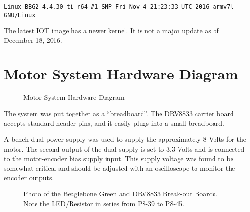\begin{verbatim}
Linux BBG2 4.4.30-ti-r64 #1 SMP Fri Nov 4 21:23:33 UTC 2016 armv7l GNU/Linux
\end{verbatim}

The latest IOT image has a newer kernel.  It is not a major update as of December 18, 2016.

\section{Motor System Hardware Diagram}

\begin{figure}[H]
	\centering
	\centering\bfseries
	\caption{Motor System Hardware Diagram}
\end{figure}

The system was put together as a ``breadboard''.  The DRV8833 carrier board accepts standard header pins, and it easily plugs into a small breadboard.

A bench dual-power supply was used to supply the approximately 8 Volts for the motor.  The second output of the dual supply is set to 3.3 Volts and is connected to the motor-encoder bias supply input.  This supply voltage was found to be somewhat critical and should be adjusted with an oscilloscope to monitor the encoder outputs.

\begin{figure}[H]
	\centering
	\centering\bfseries
	\caption{Photo of the Beaglebone Green and DRV8833 Break-out Boards.  Note the LED/Resistor in series from P8-39 to P8-45.}
\end{figure}





